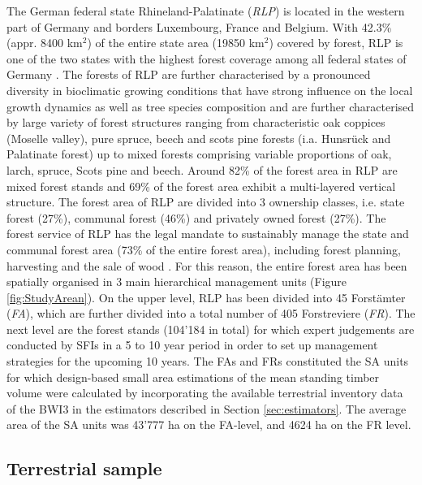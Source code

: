 \documentclass[remotesensing,article,submit,moreauthors,pdftex,10pt,a4paper]{mdpi}
\begin{document}
The German federal state Rhineland-Palatinate (\textit{RLP}) is located in the western part of Germany and borders Luxembourg, France and Belgium. With 42.3\% (appr. 8400 km$^2$) of the entire state area (19850 km$^2$) covered by forest, RLP is one of the two states with the highest forest coverage among all federal states of Germany \citep{bwi3}. The forests of RLP are further characterised by a pronounced diversity in bioclimatic growing conditions that have strong influence on the local growth dynamics as well as tree species composition \citep{gauer2005} and are further characterised by large variety of forest structures ranging from characteristic oak coppices (Moselle valley), pure spruce, beech and scots pine forests (i.a. Hunsr{\"u}ck and Palatinate forest) up to mixed forests comprising variable proportions of oak, larch, spruce, Scots pine and beech. Around 82\% of the forest area in RLP are mixed forest stands and 69\% of the forest area exhibit a multi-layered vertical structure. The forest area of RLP are divided into 3 ownership classes, i.e. state forest (27\%), communal forest (46\%) and privately owned forest (27\%). The forest service of RLP has the legal mandate to sustainably manage the state and communal forest area (73\% of the entire forest area), including forest planning, harvesting and the sale of wood \citep{lwaldg_rlp}. For this reason, the entire forest area has been spatially organised in 3 main hierarchical management units (Figure \ref{fig:StudyArean}). On the upper level, RLP has been divided into 45 Forst{\"a}mter (\textit{FA}), which are further divided into a total number of 405 Forstreviere (\textit{FR}). The next level are the forest stands (104'184 in total) for which expert judgements are conducted by SFIs in a 5 to 10 year period in order to set up management strategies for the upcoming 10 years. The FAs and FRs constituted the SA units for which design-based small area estimations of the mean standing timber volume were calculated by incorporating the available terrestrial inventory data of the BWI3 in the estimators described in Section \ref{sec:estimators}. The average area of the SA units was 43'777 ha on the FA-level, and 4624 ha on the FR level.


\subsection{Terrestrial sample}
\end{document}
